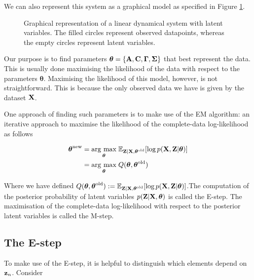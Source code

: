 \documentclass[11pt]{article}
\newcommand{\argmax}[1]{\underset{#1}{\operatorname{arg}\,\operatorname{max}}\;}
\begin{document}
We can also represent this system as a graphical model as specified in Figure \ref{fig:lds-gm}.

\begin{figure}
	\centering
	
	\caption{Graphical representation of a linear dynamical system with latent variables. The filled circles represent observed datapoints, whereas the empty circles represent latent variables.}
	\label{fig:lds-gm}
\end{figure}



Our purpose is to find parameters $\boldsymbol\theta = \{{\bf A}, {\bf C}, \boldsymbol\Gamma, \boldsymbol\Sigma\}$ that best represent the data. This is usually done maximising the likelihood of the data with respect to the parameters $\boldsymbol{\theta}$. Maximising the likelihood of this model, however, is not straightforward. This is because the only observed data we have is given by the dataset $\bf X$. %


One approach of finding such parameters is to make use of the EM algorithm: an iterative approach to maximise the likelihood of the complete-data log-likelihood as follows

\begin{align}
	\boldsymbol{\theta}^\text{new} &= \argmax{\boldsymbol{\theta}} \mathbb{E}_{{\bf Z}\vert {\bf X}, \boldsymbol{\theta}^\text{old}}[\log p({\bf X}, {\bf Z}\vert \boldsymbol\theta)]\\
	&= \argmax{\boldsymbol{\theta}} Q(\boldsymbol\theta, \boldsymbol\theta^\text{old})
\end{align}

Where we have defined $Q(\boldsymbol\theta, \boldsymbol\theta^\text{old}) := \mathbb{E}_{{\bf Z}\vert {\bf X}, \boldsymbol{\theta}^\text{old}}[\log p({\bf X}, {\bf Z}\vert \boldsymbol\theta)]$.The computation of the posterior probability of latent variables $p({\bf Z}\vert {\bf X}, \boldsymbol\theta)$ is called the E-step. The maximisation of the complete-data log-likelihood with respect to the posterior latent variables is called the M-step.


\subsection{The E-step}
To make use of the E-step, it is helpful to distinguish which elements depend on ${\bf z}_n$. Consider
\end{document}
